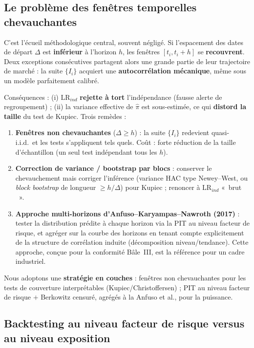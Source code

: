 \documentclass[11pt,a4paper]{article}
\providecommand{\og}{«~}
\providecommand{\fg}{~»}
\newcommand{\LRind}{\mathrm{LR}_{ind}}
\theoremstyle{remark}
\begin{document}
\subsection{Le problème des fenêtres temporelles chevauchantes}
\label{sec:overlap}

C'est l'écueil méthodologique central, souvent négligé. Si l'espacement des dates de départ $\Delta$ est \textbf{inférieur} à l'horizon $h$, les fenêtres $[t_i, t_i + h]$ se \textbf{recouvrent}. Deux exceptions consécutives partagent alors une grande partie de leur trajectoire de marché : la suite $\{I_i\}$ acquiert une \textbf{autocorrélation mécanique}, même sous un modèle parfaitement calibré.

Conséquences : (i) $\LRind$ \textbf{rejette à tort} l'indépendance (fausse alerte de regroupement) ; (ii) la variance effective de $\hat\pi$ est sous-estimée, ce qui \textbf{distord la taille} du test de Kupiec. Trois remèdes :
\begin{enumerate}[nosep]
  \item \textbf{Fenêtres non chevauchantes} ($\Delta \ge h$) : la suite $\{I_i\}$ redevient quasi-i.i.d.\ et les tests s'appliquent tels quels. Coût : forte réduction de la taille d'échantillon (un seul test indépendant tous les $h$).
  \item \textbf{Correction de variance / bootstrap par blocs} : conserver le chevauchement mais corriger l'inférence (variance HAC type Newey--West, ou \emph{block bootstrap} de longueur $\ge h/\Delta$) pour Kupiec ; renoncer à $\LRind$ \og brut \fg{}.
  \item \textbf{Approche multi-horizons d'Anfuso--Karyampas--Nawroth (2017)} : tester la distribution prédite à chaque horizon via la PIT au niveau facteur de risque, et agréger sur la courbe des horizons en tenant compte explicitement de la structure de corrélation induite (décomposition niveau/tendance). Cette approche, conçue pour la conformité Bâle~III, est la référence pour un cadre industriel.
\end{enumerate}
Nous adoptons une \textbf{stratégie en couches} : fenêtres non chevauchantes pour les tests de couverture interprétables (Kupiec/Christoffersen) ; PIT au niveau facteur de risque $+$ Berkowitz censuré, agrégés à la Anfuso et al., pour la puissance.

\subsection{Backtesting au niveau facteur de risque versus au niveau exposition}
\label{sec:niveau}
\end{document}
